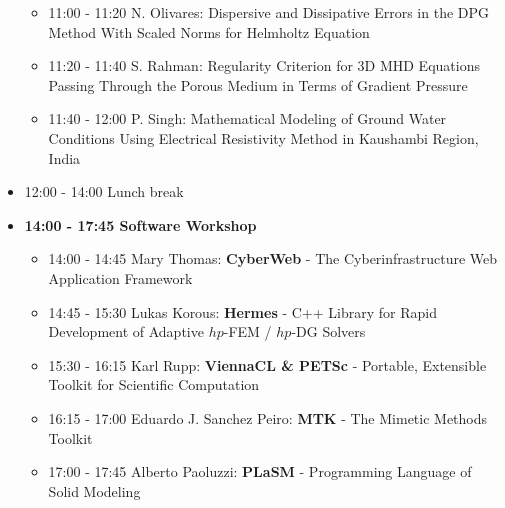 \documentclass[10pt, A4]{article}%
\begin{document}
\begin{itemize}
\begin{itemize}
    \item 11:00 - 11:20 {N. Olivares}: {Dispersive and Dissipative Errors in the DPG Method With Scaled Norms for Helmholtz Equation}
    \item 11:20 - 11:40 {S. Rahman}: {Regularity Criterion for 3D MHD Equations Passing Through the Porous Medium in Terms of Gradient Pressure} %
    \item 11:40 - 12:00 {P. Singh}: {Mathematical Modeling of Ground Water Conditions Using Electrical Resistivity Method in Kaushambi Region, India} %
  \end{itemize}
  \item 12:00 - 14:00 Lunch break
  \item {\bf 14:00 - 17:45 Software Workshop}
  \begin{itemize}
    \item 14:00 - 14:45 Mary Thomas: {\bf CyberWeb} - The Cyberinfrastructure Web Application Framework
    \item 14:45 - 15:30 Lukas Korous: {\bf Hermes} - C++ Library for Rapid Development of Adaptive $hp$-FEM / $hp$-DG Solvers
    \item 15:30 - 16:15 Karl Rupp: {\bf ViennaCL \& PETSc} - Portable, Extensible Toolkit for Scientific Computation
    \item 16:15 - 17:00 Eduardo J. Sanchez Peiro: {\bf MTK} - The Mimetic Methods Toolkit 
    \item 17:00 - 17:45 Alberto Paoluzzi: {\bf PLaSM} - Programming Language of Solid Modeling
  \end{itemize}

\end{itemize}
\end{document}
